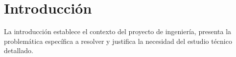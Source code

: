 \section{Introducción}

La introducción establece el contexto del proyecto de ingeniería, presenta la problemática específica a resolver y justifica la necesidad del estudio técnico detallado.